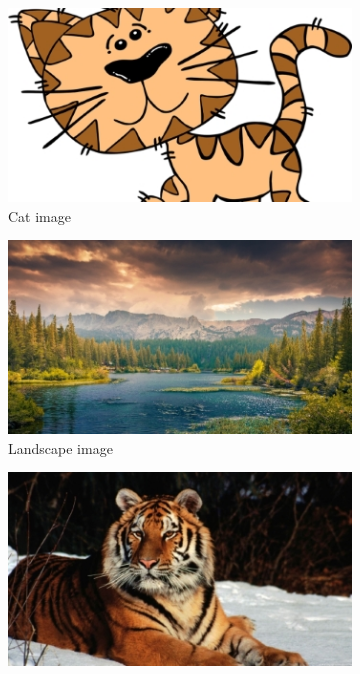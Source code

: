 \begin{figure}[H]
    \centering
    \begin{subfigure}[b]{0.33\textwidth}
        \includegraphics[width=\textwidth]{figures/cat}
            \caption{Cat image \\\citep{imgCat}}
    \end{subfigure}
    \begin{subfigure}[b]{0.33\textwidth}
            \includegraphics[width=\textwidth]{figures/landscape}
            \caption{Landscape image \\\citep{imgLandscape}}
    \end{subfigure}
    \begin{subfigure}[b]{0.33\textwidth}
            \includegraphics[width=\textwidth]{figures/tiger}

\end{subfigure}
\end{figure}
